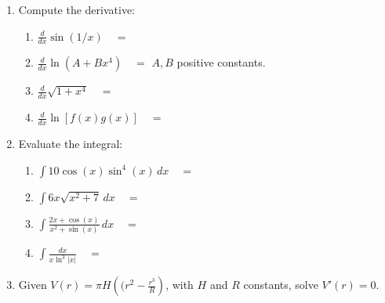 \documentclass[12pt]{article}
\newcommand{\di}{\displaystyle}
\newcommand{\abs}[1]{\lvert #1\rvert}
\begin{document}
\newpage



  \begin{enumerate}
    \item Compute the derivative:
  
    \begin{enumerate}
    \item $\di\frac{d}{dx}\sin(1/x) \quad =$
    
    \vspace{1cm}
    
    \item $\di\frac{d}{dx}\ln(A+Bx^4) \quad=$ \hspace*{\fill} $A, B$ positive constants.
    
    \vspace{1cm}
    
    \item $\di\frac{d}{dx}\sqrt{1+x^4}\quad =$
    
    \vspace{1cm}
    
    \item $\di\frac{d}{dx}\ln[f(x)g(x)]\quad =$
    
    \vspace{2cm}
   
    \end{enumerate} 
    \item Evaluate the integral:
    \begin{enumerate}
    \item $\di\int 10\cos(x)\sin^4(x)\,dx\quad =$
    
    \vspace{1cm}
    
    \item $\di\int 6x\sqrt{x^2+7}\,dx\quad =$
    
    \vspace{1cm}
    
    \item $\di\int\frac{2x+\cos(x)}{x^2+\sin(x)}\,dx\quad =$
    
    \vspace{1cm}
    
    \item $\di\int\frac{dx}{x\ln^3\abs{x}}\quad =$
    \end{enumerate}
    \newpage
    
    \item Given $V(r)=\pi H\left((r^2-\frac{r^3}{R}\right)$, with $H$ and $R$ constants, solve $V'(r)=0$.


\end{enumerate}
\end{document}

